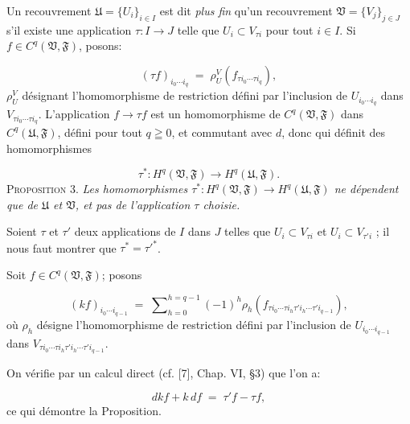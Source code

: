 Un recouvrement $\mathfrak{U} = \{U_{i}\}_{i \in I}$ est dit \textit{plus fin} qu'un recouvrement $\mathfrak{V} = \{V_{j}\}_{j \in J}$ s'il existe une application $\tau : I \to J$ telle que $U_{i} \subset V_{\tau i}$ pour tout $i \in I$. Si $f \in C^{q}(\mathfrak{V}, \mathfrak{F})$, posons:

\begin{equation*}
(\tau f)_{i_{0} \cdots i_{q}} \;=\; \rho_{U}^{V}(f_{\tau i_{0} \cdots \tau i_{q}}),
\end{equation*}
$\rho_{U}^{V}$ désignant l'homomorphisme de restriction défini par l'inclusion de $U_{i_{0} \cdots i_{q}}$ dans $V_{\tau i_{0} \cdots \tau i_{q}}$. L'application $f \to \tau f$ est un homomorphisme de $C^{q}(\mathfrak{V}, \mathfrak{F})$ dans $C^{q}(\mathfrak{U}, \mathfrak{F})$, défini pour tout $q \geqq 0$, et commutant avec $d$, donc qui définit des homomorphismes

\begin{equation*}
\tau^{*} : H^{q}(\mathfrak{V}, \mathfrak{F}) \to H^{q}(\mathfrak{U}, \mathfrak{F}).
\end{equation*}
\textsc{Proposition} 3. \textit{Les homomorphismes $\tau^{*} : H^{q}(\mathfrak{V}, \mathfrak{F}) \to H^{q}(\mathfrak{U}, \mathfrak{F})$ ne dépendent que de $\mathfrak{U}$ et $\mathfrak{V}$, et pas de l'application $\tau$ choisie.}

Soient $\tau$ et $\tau'$ deux applications de $I$ dans $J$ telles que $U_{i} \subset V_{\tau i}$ et $U_{i} \subset V_{\tau' i}$ ; il nous faut montrer que $\tau^{*} = \tau'^{*}$.

Soit $f \in C^{q}(\mathfrak{V}, \mathfrak{F})$; posons

\begin{equation*}
(kf)_{i_{0} \cdots i_{q-1}} \;=\; \sum\nolimits_{h=0}^{h=q-1} (-1)^{h}\rho_{h}(f_{\tau i_{0} \cdots \tau i_{h} \tau' i_{h} \cdots \tau' i_{q-1}}),
\end{equation*}
où $\rho_{h}$ désigne l'homomorphisme de restriction défini par l'inclusion de $U_{i_{0} \cdots i_{q-1}}$ dans $V_{\tau i_{0} \cdots \tau i_{h} \tau' i_{h} \cdots \tau' i_{q-1}}$.

On vérifie par un calcul direct (cf. [7], Chap. VI, \S3) que l'on a:

\begin{equation*}
dkf + k\, df \;=\; \tau'f - \tau f,
\end{equation*}
ce qui démontre la Proposition.



